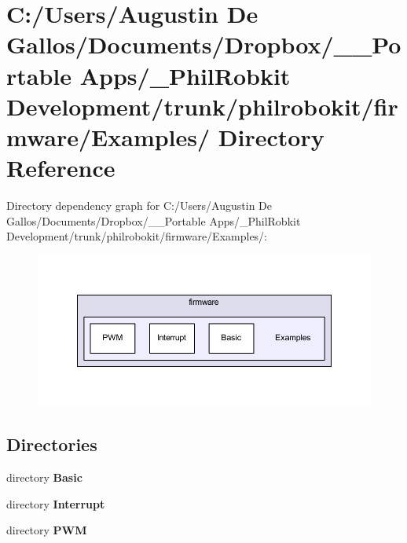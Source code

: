 \section{C\-:/\-Users/\-Augustin De Gallos/\-Documents/\-Dropbox/\-\_\-\-\_\-\-Portable Apps/\-\_\-\-Phil\-Robkit Development/trunk/philrobokit/firmware/\-Examples/ Directory Reference}
\label{dir_571363f052f17c63af85fd802886e30f}
Directory dependency graph for C\-:/\-Users/\-Augustin De Gallos/\-Documents/\-Dropbox/\-\_\-\-\_\-\-Portable Apps/\-\_\-\-Phil\-Robkit Development/trunk/philrobokit/firmware/\-Examples/\-:\nopagebreak
\begin{figure}[H]
\begin{center}
\leavevmode
\includegraphics[width=350pt]{dir_571363f052f17c63af85fd802886e30f_dep}
\end{center}
\end{figure}
\subsection*{Directories}
\begin{DoxyCompactItemize}
\item 
directory {\bf Basic}
\item 
directory {\bf Interrupt}
\item 
directory {\bf P\-W\-M}
\end{DoxyCompactItemize}

